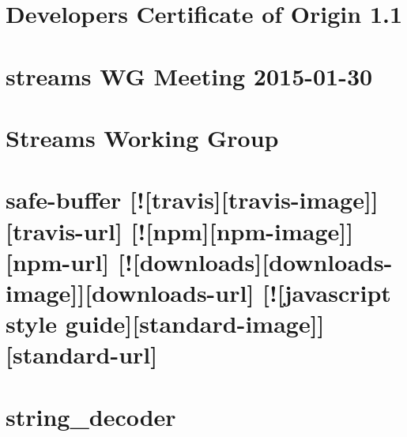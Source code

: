 \documentclass[twoside]{book}
\newcommand{\+}{\discretionary{\mbox{\scriptsize$\hookleftarrow$}}{}{}}
\begin{document}
\chapter{Developer\textquotesingle{}s Certificate of Origin 1.1}
\label{md_dsmacc_examples_DRmerge_node_modules_readable-stream_CONTRIBUTING}

\chapter{streams WG Meeting 2015-\/01-\/30}
\label{md_dsmacc_examples_DRmerge_node_modules_readable-stream_doc_wg-meetings_2015-01-30}

\chapter{Streams Working Group}
\label{md_dsmacc_examples_DRmerge_node_modules_readable-stream_GOVERNANCE}

\chapter{safe-\/buffer \mbox{[}!\mbox{[}travis\mbox{]}\mbox{[}travis-\/image\mbox{]}\mbox{]}\mbox{[}travis-\/url\mbox{]} \mbox{[}!\mbox{[}npm\mbox{]}\mbox{[}npm-\/image\mbox{]}\mbox{]}\mbox{[}npm-\/url\mbox{]} \mbox{[}!\mbox{[}downloads\mbox{]}\mbox{[}downloads-\/image\mbox{]}\mbox{]}\mbox{[}downloads-\/url\mbox{]} \mbox{[}!\mbox{[}javascript style guide\mbox{]}\mbox{[}standard-\/image\mbox{]}\mbox{]}\mbox{[}standard-\/url\mbox{]}}
\label{md_dsmacc_examples_DRmerge_node_modules_readable-stream_node_modules_safe-buffer_README}

\chapter{string\+\_\+decoder}
\label{md_dsmacc_examples_DRmerge_node_modules_readable-stream_node_modules_string_decoder_README}

\end{document}
